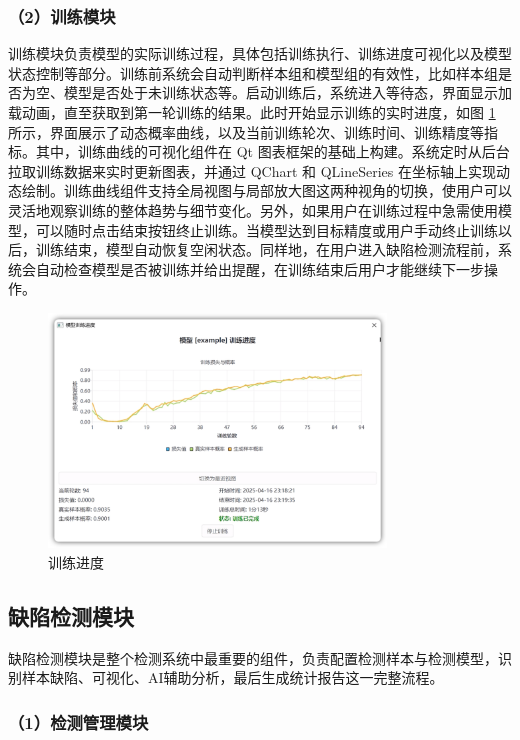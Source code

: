 \documentclass[
  ]{njuthesis}
\begin{document}
\subsubsection{（2）训练模块}

训练模块负责模型的实际训练过程，具体包括训练执行、训练进度可视化以及模型状态控制等部分。训练前系统会自动判断样本组和模型组的有效性，比如样本组是否为空、模型是否处于未训练状态等。启动训练后，系统进入等待态，界面显示加载动画，直至获取到第一轮训练的结果。此时开始显示训练的实时进度，如图 \ref{训练进度} 所示，界面展示了动态概率曲线，以及当前训练轮次、训练时间、训练精度等指标。其中，训练曲线的可视化组件在 Qt 图表框架的基础上构建。系统定时从后台拉取训练数据来实时更新图表，并通过 QChart 和 QLineSeries 在坐标轴上实现动态绘制。训练曲线组件支持全局视图与局部放大图这两种视角的切换，使用户可以灵活地观察训练的整体趋势与细节变化。另外，如果用户在训练过程中急需使用模型，可以随时点击结束按钮终止训练。当模型达到目标精度或用户手动终止训练以后，训练结束，模型自动恢复空闲状态。同样地，在用户进入缺陷检测流程前，系统会自动检查模型是否被训练并给出提醒，在训练结束后用户才能继续下一步操作。

\begin{figure}[htb]
    \centering
    \includegraphics[width=0.80\textwidth]{images/训练进度.png}
    \caption{训练进度}
    \label{训练进度}
\end{figure}

\subsection{缺陷检测模块}

缺陷检测模块是整个检测系统中最重要的组件，负责配置检测样本与检测模型，识别样本缺陷、可视化、AI辅助分析，最后生成统计报告这一完整流程。

\subsubsection{（1）检测管理模块}
\end{document}
